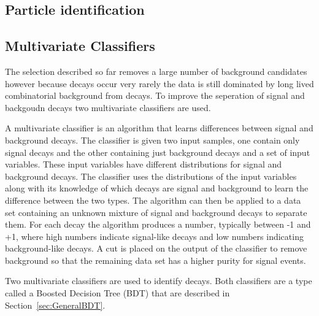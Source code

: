 


\subsection{Particle identification}
\label{sec:BFpid}

\subsection{Multivariate Classifiers}
\label{sec:MVC}

The selection described so far removes a large number of background candidates however because \bmumu decays occur very rarely the data is still dominated by long lived combinatorial background from \bbbarmumux decays. To improve the seperation of signal and backgoudn decays two  multivariate classifiers are used.

A multivariate classifier is an algorithm that learns differences between signal and background decays. The classifier is given two input samples, one contain only signal decays and the other containing just background decays and a set of input variables. These input variables have different distributions for signal and background decays. The classifier uses the distributions of the input variables along with its knowledge of which decays are signal and background to learn the difference between the two types. The algorithm can then be applied to a data set containing an unknown mixture of signal and background decays to separate them. For each decay the algorithm produces a number, typically between -1 and +1, where high numbers indicate signal-like decays and low numbers indicating background-like decays. A cut is placed on the output of the classifier to remove background so that the remaining data set has a higher purity for signal events.

Two multivariate classifiers are used to identify \bsmumu decays. Both classifiers are a type called a Boosted Decision Tree (BDT) that are described in Section~\ref{sec:GeneralBDT}. %

